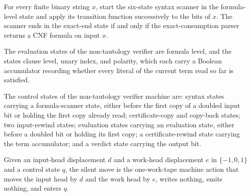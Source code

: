 \begin{lemma}
\label{Complexity.taut_syntax_parse}
\leanok
{}
For every finite binary string $x$, start the six-state syntax scanner in the
formula-level state and apply its transition function successively to the bits of $x$.
The scanner ends in the exact-end state if and only if the exact-consumption parser
returns a CNF formula on input $x$.
\end{lemma}

\begin{definition}
\label{Complexity.TautEval}
\leanok
The evaluation states of the non-tautology verifier are formula level, and the states
clause level, unary index, and polarity, which each carry a Boolean accumulator
recording whether every literal of the current term read so far is satisfied.
\end{definition}

\begin{definition}
\label{Complexity.TautControl}
\leanok
{}
The control states of the non-tautology verifier machine are: syntax states carrying a
formula-scanner state, either before the first copy of a doubled input bit or holding
the first copy already read; certificate-copy and copy-back states; two input-rewind
states; evaluation states carrying an evaluation state, either before a doubled bit or
holding its first copy; a certificate-rewind state carrying the term accumulator; and
a verdict state carrying the output bit.
\end{definition}

\begin{definition}
\label{Complexity.tautMove}
\leanok
{}
Given an input-head displacement $d$ and a work-head displacement $e$ in
$\{-1, 0, 1\}$ and a control state $q$, the silent move is the one-work-tape machine
action that moves the input head by $d$ and the work head by $e$, writes nothing,
emits nothing, and enters $q$.
\end{definition}

